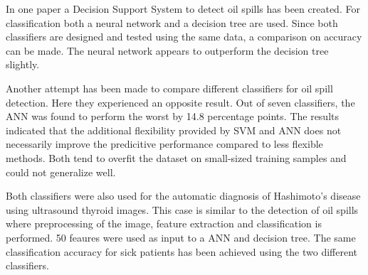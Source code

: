 In one paper a Decision Support System to detect oil spills has been created. For classification both a neural network and a decision tree are used. Since both classifiers are designed and tested using the same data, a comparison on accuracy can be made. The neural network appears to outperform the decision tree slightly. \cite{Mera201472}
	
	Another attempt has been made to compare different classifiers for oil spill detection.\cite{Xu201414} Here they experienced an opposite result. Out of seven classifiers, the ANN was found to perform the worst by 14.8 percentage points. The results indicated that the additional flexibility provided by SVM and ANN does not necessarily improve the predicitive performance compared to less flexible methods. Both tend to overfit the dataset on small-sized training samples and could not generalize well.
	
	Both classifiers were also used for the automatic diagnosis of Hashimoto's disease using ultrasound thyroid images\cite{Omiotek201340}. This case is similar to the detection of oil spills where preprocessing of the image, feature extraction and classification is performed. 50 feaures were used as input to a ANN and decision tree. The same classification accuracy for sick patients has been achieved using the two different classifiers.


	